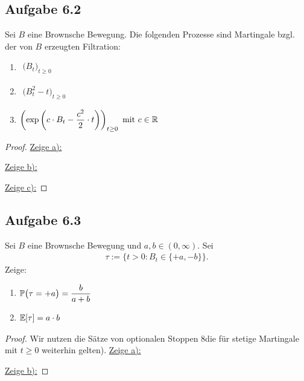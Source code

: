 \subsection{Aufgabe 6.2}
Sei $B$ eine Brownsche Bewegung.
Die folgenden Prozesse sind Martingale bzgl. der von $B$ erzeugten Filtration:
\begin{enumerate}[label=\alph*)]
	\item $\begin{aligned}
		\big(B_t\big)_{t\geq0}
	\end{aligned}$
	\item $\begin{aligned}
		\big(B_t^2-t\big)_{t\geq0}
	\end{aligned}$
	\item $\begin{aligned}
		\left(\exp\left(c\cdot B_t-\frac{c^2}{2}\cdot t\right)\right)_{t\geq0}\mit c\in\R
	\end{aligned}$
\end{enumerate}

\begin{proof}
	\underline{Zeige a):}

	\underline{Zeige b):}

	\underline{Zeige c):}
\end{proof}

\subsection{Aufgabe 6.3}
Sei $B$ eine Brownsche Bewegung und $a,b\in(0,\infty)$.
Sei
\begin{align*}
	\tau:=\Big\lbrace t>0:B_t\in\lbrace+a,-b\rbrace\Big\rbrace.
\end{align*}
Zeige:
\begin{enumerate}[label=\alph*)]
	\item $\begin{aligned}
		\P\big(\tau=+a\big)=\frac{b}{a+b}
	\end{aligned}$
	\item $\begin{aligned}
		\E[\tau]=a\cdot b
	\end{aligned}$
\end{enumerate}

\begin{proof}
	Wir nutzen die Sätze  von optionalen Stoppen 8die für stetige Martingale mit $t\geq0$ weiterhin gelten).\nl
	\underline{Zeige a):}

	\underline{Zeige b):}

\end{proof}

